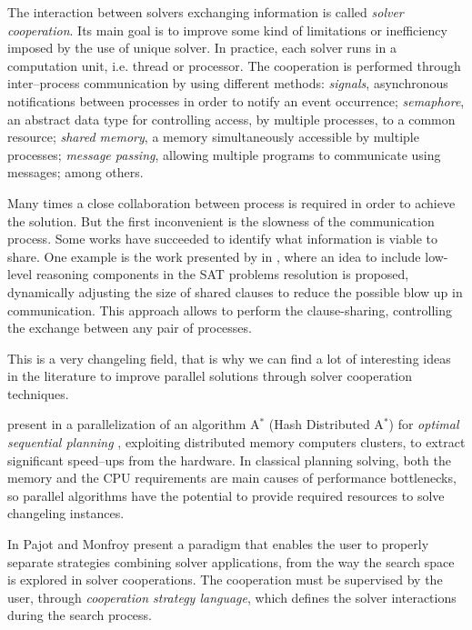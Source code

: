 The interaction between solvers exchanging information is called {\it solver cooperation}. %
Its main goal is to improve some kind of limitations or inefficiency imposed by the use of unique solver. In practice, each solver runs in a computation unit, i.e. thread or processor. The cooperation is performed through inter--process communication by using different methods: \textit{signals}, asynchronous notifications between processes in order to notify an event occurrence; \textit{semaphore}, an abstract data type for controlling access, by multiple processes, to a common resource; \textit{shared memory}, a memory simultaneously accessible by multiple processes; \textit{message passing}, allowing multiple programs to communicate using messages; among others.

Many times a close collaboration between process is required in order to achieve the solution. But the first inconvenient is the slowness of the communication process. Some works have succeeded to identify what information is viable to share. One example is the work presented by  in \cite{Hamadi2012}, where an idea to include low-level reasoning components in the SAT problems resolution is proposed, dynamically adjusting the size of shared clauses to reduce the possible blow up in communication. This approach allows to perform the clause-sharing, controlling the exchange between any pair of processes.

This is a very changeling field, that is why we can find a lot of interesting ideas in the literature to improve parallel solutions through solver cooperation techniques. 

 present in \cite{Kishimoto2009} a parallelization of an algorithm A$^*$ (Hash Distributed A$^*$) for \textit{optimal sequential planning} \cite{Schmegner2004}, exploiting distributed memory computers clusters, to extract significant speed--ups from the hardware. In classical planning solving, both the memory and the CPU requirements are main causes of performance bottlenecks, so parallel algorithms have the potential to provide required resources to solve changeling instances. 

In \cite{Pajot2003} Pajot and Monfroy present a paradigm that enables the user to properly separate strategies combining solver applications, from the way the search space is explored in solver cooperations. The cooperation must be supervised by the user, through {\it cooperation strategy language}, which defines the solver interactions during the search process.

